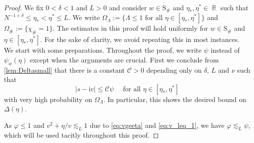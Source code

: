 \documentclass[10pt,a4paper]{amsart}
\DeclareMathOperator{\RR}{\mathbb{R}}
\newcommand{\ii}{\mathrm{i}}
\newcommand{\abs}[1]{\left| #1 \right|}
\numberwithin{equation}{section}
\begin{document}
	\begin{proof}
		We fix $0 <\delta <1$ and $ L >0$ and consider $w \in \mathrm{S}_\#$ and $\eta_{\ast},\eta^\ast \in \RR$ such that $ N^{-1+\delta} \le \eta_{\ast} < \eta^{\ast} \le L$. We write $ \Omega_\Lambda :=\{ \Lambda \leq 1 \text{ for all } \eta \in [ \eta_{\ast}, \eta^{\ast}]\}$ and $\Omega_{\#} := \{ \chi_\#=1\}$. 	The estimates in this proof will hold uniformly for $w \in \mathrm{S}_\#$ and $\eta \in [\eta_*,\eta^*]$. For the sake of clarity, we avoid repeating this in most instances.
		We start with some preparations. 
		Throughout the proof, we write $\psi$ instead of $\psi_w(\eta)$ except when the arguments are crucial.  
		First we conclude from \cref{lem:Deltasmall} that there is a constant $\mathcal C>0$ depending only on $\delta$, $L$ and $\nu$ such that 
		\begin{equation} \label{eq:proof_bootstrapp_edge_aux2} 
			\abs{s - \ii v} \leq \mathcal C \psi \quad \text{ for all } \eta \in [\eta_\ast, \eta^\ast]
		\end{equation} 
		with very high probability on $\Omega_\Lambda$. In particular, this shows the desired bound on $\Delta(\eta)$. 
		
		As $\varphi   \le 1$ and $v^2 + \eta/v \lesssim_L 1$ due to \eqref{eq:vgeeta} and \eqref{eq:v_leq_1}, we have $\varphi \lesssim_L\psi$, which will be used tacitly throughout this proof. 
		

\end{proof}
\end{document}

